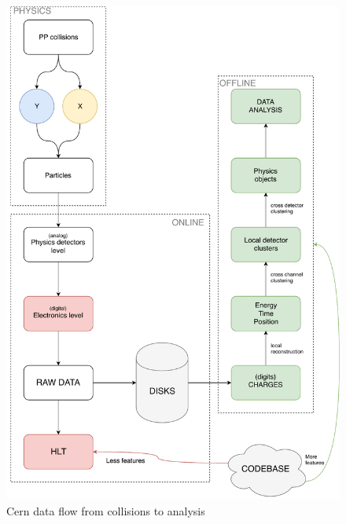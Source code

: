 \begin{figure}[ht]
  \includegraphics[height=\textheight]{img/dataflow}
  \caption{Cern data flow from collisions to analysis}
  \label{img:dataflow}
\end{figure}

